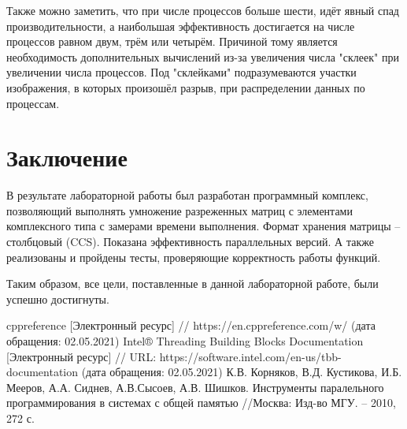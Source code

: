 \documentclass{report}
\begin{document}
	\par Также можно заметить, что при числе процессов больше шести, идёт явный спад производительности, а наибольшая эффективность достигается на числе процессов равном двум, трём или четырём. Причиной тому является необходимость дополнительных вычислений из-за увеличения числа "склеек" при увеличении числа процессов. Под "склейками" подразумеваются участки изображения, в которых произошёл разрыв, при распределении данных по процессам.
	\newpage


	\section*{Заключение}
		\par В результате лабораторной работы был разработан программный комплекс, позволяющий выполнять умножение разреженных матриц с элементами комплексного типа с замерами времени выполнения. Формат хранения матрицы – столбцовый (CCS). Показана эффективность параллельных версий. А также реализованы и пройдены тесты, проверяющие корректность работы функций.
		\par Таким образом, все цели, поставленные в данной лабораторной работе, были успешно достигнуты.
	\newpage


	\begin{thebibliography}{1}
		 cppreference [Электронный ресурс] // https://en.cppreference.com/w/ (дата обращения: 02.05.2021)
         Intel® Threading Building Blocks Documentation [Электронный ресурс] // URL: https://software.intel.com/en-us/tbb-documentation (дата обращения: 02.05.2021)
		 К.В. Корняков, В.Д. Кустикова, И.Б. Мееров, А.А. Сиднев, А.В.Сысоев, А.В. Шишков. Инструменты паралельного программирования в системах с общей памятью //Москва: Изд-во МГУ. – 2010, 272 с.
	\end{thebibliography}
	\newpage


\end{document}
